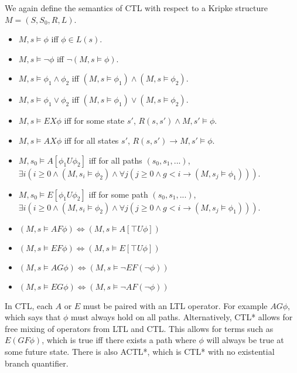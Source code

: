 We again define the semantics of CTL with respect to a Kripke structure $M =
(S, S_0, R, L)$.

\begin{itemize}
    \item $M, s \models \phi$ iff $\phi \in L(s)$.
    \item $M, s \models \lnot\phi$ iff $\lnot (M, s \models \phi)$.
    \item $M, s \models \phi_1 \land \phi_2$ iff $(M, s \models \phi_1) \land (M, s \models \phi_2)$.
    \item $M, s \models \phi_1 \lor \phi_2$ iff $(M, s \models \phi_1) \lor (M, s \models \phi_2)$.
    \item $M, s \models EX\phi$ iff for some state $s'$, $R(s, s') \land M, s' \models \phi$.
    \item $M, s \models AX\phi$ iff for all states $s'$, $R(s, s') \to M, s' \models \phi$.
    \item $M, s_0 \models A[\phi_1 U \phi_2]$ iff for all paths $(s_0, s_1, ...)$, $\exists i (i \geq 0 \land (M, s_i \models \phi_2) \land \forall j (j \geq 0 \land g < i \to (M, s_j \models \phi_1)))$.
    \item $M, s_0 \models E[\phi_1 U \phi_2]$ iff for some path $(s_0, s_1, ...)$, $\exists i (i \geq 0 \land (M, s_i \models \phi_2) \land \forall j (j \geq 0 \land g < i \to (M, s_j \models \phi_1)))$.
    \item $(M, s \models AF\phi) \Leftrightarrow (M, s \models A[\top U \phi])$
    \item $(M, s \models EF\phi) \Leftrightarrow (M, s \models E[\top U \phi])$
    \item $(M, s \models AG\phi) \Leftrightarrow (M, s \models \lnot EF (\lnot \phi))$
    \item $(M, s \models EG\phi) \Leftrightarrow (M, s \models \lnot AF (\lnot \phi))$
\end{itemize}

In CTL, each $A$ or $E$ must be paired with an LTL operator. For example
$AG\phi$, which says that $\phi$ must always hold on all paths. Alternatively,
CTL* allows for free mixing of operators from LTL and CTL. This allows for
terms such as $E(GF\phi)$, which is true iff there exists a path where $\phi$
will always be true at some future state. There is also ACTL*, which is CTL* with no existential branch quantifier.


